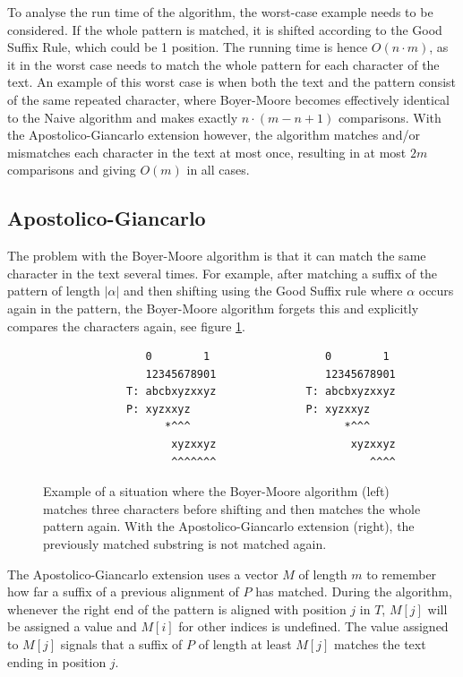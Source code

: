 To analyse the run time of the algorithm, the worst-case example needs to be considered. If the whole pattern is matched, it is shifted according to the Good Suffix Rule, which could be 1 position. The running time is hence $O(n\cdot m)$, as it in the worst case needs to match the whole pattern for each character of the text. An example of this worst case is when both the text and the pattern consist of the same repeated character, where Boyer-Moore becomes effectively identical to the Naive algorithm and makes exactly $n\cdot(m-n+1)$ comparisons. With the Apostolico-Giancarlo extension however, the algorithm matches and/or mismatches each character in the text at most once, resulting in at most $2m$ comparisons and giving $O(m)$ in all cases. 

\subsection{Apostolico-Giancarlo}

The problem with the Boyer-Moore algorithm is that it can match the same character in the text several times. For example, after matching a suffix of the pattern of length $|\alpha|$ and then shifting using the Good Suffix rule where $\alpha$ occurs again in the pattern, the Boyer-Moore algorithm forgets this and explicitly compares the characters again, see figure \ref{fig:apostolicoexample}. 

\begin{figure}[ht!]
\begin{verbatim}
                0        1                  0        1 
                12345678901                 12345678901
             T: abcbxyzxxyz              T: abcbxyzxxyz
             P: xyzxxyz                  P: xyzxxyz    
                   *^^^                        *^^^    
                    xyzxxyz                     xyzxxyz
                    ^^^^^^^                        ^^^^
\end{verbatim}
\caption{Example of a situation where the Boyer-Moore algorithm (left) matches three characters before shifting and then matches the whole pattern again. With the Apostolico-Giancarlo extension (right), the previously matched substring is not matched again. }
\label{fig:apostolicoexample}
\end{figure}

The Apostolico-Giancarlo extension uses a vector $M$ of length $m$ to remember how far a suffix of a previous alignment of $P$ has matched. During the algorithm, whenever the right end of the pattern is aligned with position $j$ in $T$, $M[j]$ will be assigned a value and $M[i]$ for other indices is undefined. The value assigned to $M[j]$ signals that a suffix of $P$ of length at least $M[j]$ matches the text ending in position $j$. 

